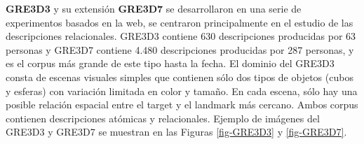 \label{sec:corpusGRE}
{\bf GRE3D3} y su extensi\'on {\bf GRE3D7} \cite{gre3d3,gre3d7} se desarrollaron en una serie de experimentos basados en la web, se centraron principalmente en el estudio de las descripciones relacionales. GRE3D3 contiene 630 descripciones producidas por 63 personas y GRE3D7 contiene 4.480 descripciones producidas por 287 personas, y es el corpus m\'as grande de este tipo hasta la fecha. El dominio del GRE3D3 consta de escenas visuales simples que contienen s\'olo dos tipos de objetos (cubos y esferas) con variaci\'on limitada en color y tama\~no. En cada escena, s\'olo hay una posible relaci\'on espacial entre el target y el landmark m\'as cercano. Ambos corpus contienen descripciones at\'omicas y relacionales. Ejemplo de im\'agenes del GRE3D3 y GRE3D7 se muestran en las Figuras \ref{fig-GRE3D3} y \ref{fig-GRE3D7}.

